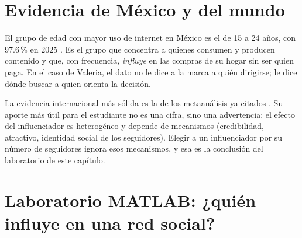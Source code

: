 \section{Evidencia de México y del mundo}

El grupo de edad con mayor uso de internet en México es el de 15 a 24 años,
con 97.6\,\% en 2025 \parencite{inegi2026endutih}. Es el grupo que concentra a
quienes consumen y producen contenido y que, con frecuencia, \emph{influye}
en las compras de su hogar sin ser quien paga. En el caso de Valeria, el
dato no le dice a la marca a quién dirigirse; le dice dónde buscar a quien
orienta la decisión.

La evidencia internacional más sólida es la de los metaanálisis ya citados
\parencite{leung2022influencer,barari2025influencer}. Su aporte más útil
para el estudiante no es una cifra, sino una advertencia: el efecto del
influenciador es heterogéneo y depende de mecanismos (credibilidad,
atractivo, identidad social de los seguidores). Elegir a un influenciador
por su número de seguidores ignora esos mecanismos, y esa es la
conclusión del laboratorio de este capítulo.

\section{Laboratorio MATLAB: ¿quién influye en una red social?}
\label{sec:cap08-lab}

